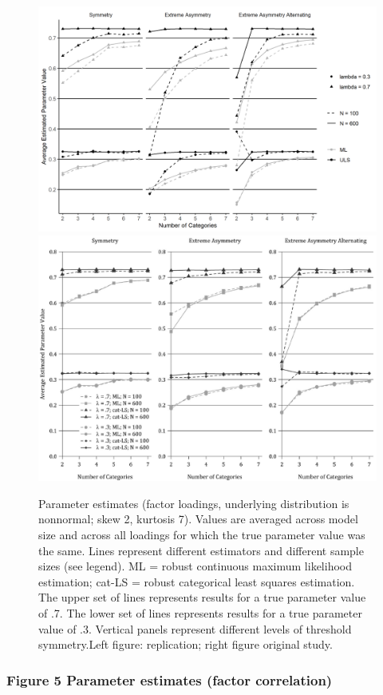 \documentclass[10,a4paperpaper,]{article}
\begin{document}
\begin{figure}
\includegraphics[width=0.49\linewidth]{./figures/fig_4} \includegraphics[width=0.49\linewidth]{./figures/fig4_original} \caption{Parameter estimates (factor loadings, underlying distribution is nonnormal; skew 2, kurtosis 7). Values are averaged across model size and across all loadings for which the true parameter value was the same. Lines represent different estimators and different sample sizes (see legend). ML = robust continuous maximum likelihood estimation; cat-LS = robust categorical least squares estimation. The upper set of lines represents results for a true parameter value of .7. The lower set of lines represents results for a true parameter value of .3. Vertical panels represent different levels of threshold symmetry.Left figure: replication; right figure original study.}\label{fig:fig4}
\end{figure}

\subsubsection{Figure 5 Parameter estimates (factor correlation)}
\end{document}
